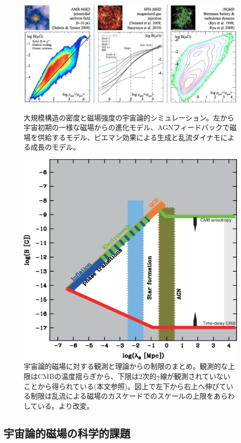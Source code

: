 \begin{figure}[tbp]
\begin{center}
\includegraphics[width=0.8\linewidth]{magnetism/c06.s1.ss6.f1.eps}
\end{center}
\caption{
大規模構造の密度と磁場強度の宇宙論的シミュレーション。左から宇宙初期の一様な磁場からの進化モデル\citep{2008A&A...482L..13D}、AGNフィードバックで磁場を供給するモデル\citep{2010MNRAS.408..684S}、ビエマン効果による生成と乱流ダイナモによる成長のモデル\citep{2008Sci...320..909R}。
}\label{c06.s1.ss6.f1}
\begin{center}
\includegraphics[width=0.7\linewidth]{magnetism/c06.s1.ss7.f1.eps}
\end{center}
\caption{宇宙論的磁場に対する観測と理論からの制限のまとめ。観測的な上限はCMBの温度揺らぎから、下限は2次的$\gamma$線が観測されていないことから得られている(本文参照)。図上で左下から右上へ伸びている制限は乱流による磁場のカスケードでのスケールの上限をあらわしている。\cite{2013A&ARv..21...62D}より改変。
}\label{c06.s1.ss7.f1}
\end{figure}

\subsection{宇宙論的磁場の科学的課題}
\label{c06.s1.ss7}

